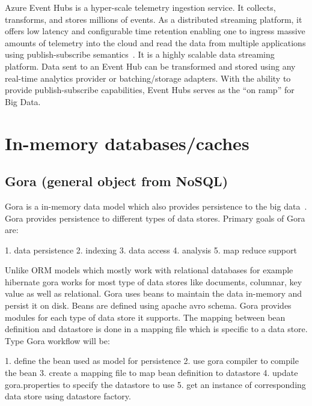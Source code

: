 Azure Event Hubs is a hyper-scale telemetry ingestion service. It
collects, transforms, and stores millions of events. As a distributed
streaming platform, it offers low latency and configurable time
retention enabling one to ingress massive amounts of telemetry into
the cloud and read the data from multiple applications using
publish-subscribe semantics~\cite{www-eventhubs}. It is a highly
scalable data streaming platform. Data sent to an Event Hub can be
transformed and stored using any real-time analytics provider or
batching/storage adapters. With the ability to provide
publish-subscribe capabilities, Event Hubs serves as the ``on ramp''
for Big Data.

     \pv

\section{In-memory databases/caches}
\label{S:o-db-memory}


\subsection{Gora (general object from NoSQL)}

Gora is a in-memory data model which also provides persistence to the
big data~\cite{www-gora}.  Gora provides persistence to different
types of data stores. Primary goals of Gora are:

     1. data persistence
     2. indexing
     3. data access
     4. analysis
     5. map reduce support

     Unlike ORM models which mostly work with relational databases for
     example hibernate gora works for most type of data stores like
     documents, columnar, key value as well as relational. Gora uses
     beans to maintain the data in-memory and persist it on
     disk. Beans are defined using apache avro schema. Gora provides
     modules for each type of data store it supports.  The mapping
     between bean definition and datastore is done in a mapping file
     which is specific to a data store.  Type Gora workflow will be:

     1. define  the bean used as model for persistence
     2. use gora compiler to compile the bean
     3. create a mapping file to map bean definition to datastore
     4. update gora.properties to specify the datastore to use
     5. get an instance of corresponding data store using datastore factory.

